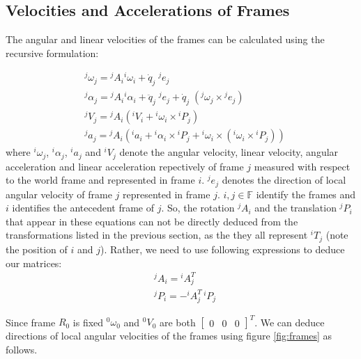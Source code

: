 \documentclass[a4paper,10pt]{article}
\begin{document}
\subsection{Velocities and Accelerations of Frames}
The angular and linear velocities of the frames can be calculated using the recursive formulation:

\begin{align}
 &{}^j\omega_j={}^jA_i{}^i\omega_i+\dot{q}_j\;{}^je_j \\
 &{}^j\alpha_j={}^jA_i{}^i\alpha_i+\ddot{q}_j\;{}^je_j+\dot{q}_j\;({}^j\omega_j \times {}^je_j) \\
 &{}^jV_j={}^jA_i\left({}^iV_i+{}^i\omega_i \times {}^iP_j\right) \\
 &{}^ja_j={}^jA_i\left({}^ia_i+{}^i\alpha_i \times {}^iP_j + {}^i\omega_i \times ({}^i\omega_i \times {}^iP_j)\right)
\end{align} where ${}^i\omega_j$, ${}^i\alpha_j$, ${}^ia_j$ and ${}^iV_j$ denote the angular velocity, linear velocity, 
angular acceleration and linear acceleration repectively of frame $j$ measured with respect to the 
world frame and represented in frame $i$. ${}^je_j$ denotes the direction of local angular velocity of frame $j$ represented in frame $j$. 
$i, j \in \mathbb{F}$ identify the frames and $i$ identifies the antecedent frame of $j$. So, the rotation ${}^jA_i$ and the 
translation ${}^jP_i$ that appear in these equations can not be directly deduced from the transformations listed in the previous section, 
as the they all represent ${}^iT_j$ (note the position of $i$ and $j$). Rather, we need to use following expressions to deduce our matrices:
\begin{align}
 &{}^jA_i = {}^iA_j^T \nonumber \\ 
 &{}^jP_i = -{}^iA_j^T\,{}^iP_j \nonumber
\end{align}

Since frame $R_0$ is fixed ${}^0\omega_0$ and ${}^0V_0$ are both $\left[\begin{matrix}0 & 0 & 0\end{matrix}\right]^T$. We can deduce directions of 
local angular velocities of the frames using figure \ref{fig:frames} as follows.
\end{document}
